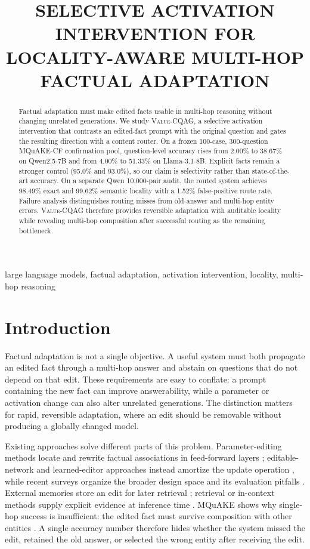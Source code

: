 \documentclass{article}
\title{SELECTIVE ACTIVATION INTERVENTION FOR LOCALITY-AWARE MULTI-HOP FACTUAL ADAPTATION}
\newcommand{\method}{\textsc{Value-CQAG}}
\begin{document}
\ninept
\sloppy
\maketitle

\begin{abstract}
Factual adaptation must make edited facts usable in multi-hop reasoning without changing unrelated generations. We study \method{}, a selective activation intervention that contrasts an edited-fact prompt with the original question and gates the resulting direction with a content router. On a frozen 100-case, 300-question MQuAKE-CF confirmation pool, question-level accuracy rises from 2.00\% to 38.67\% on Qwen2.5-7B and from 4.00\% to 51.33\% on Llama-3.1-8B. Explicit facts remain a stronger control (95.0\% and 93.0\%), so our claim is selectivity rather than state-of-the-art accuracy. On a separate Qwen 10,000-pair audit, the routed system achieves 98.49\% exact and 99.62\% semantic locality with a 1.52\% false-positive route rate. Failure analysis distinguishes routing misses from old-answer and multi-hop entity errors. \method{} therefore provides reversible adaptation with auditable locality while revealing multi-hop composition after successful routing as the remaining bottleneck.
\end{abstract}

\begin{keywords}
large language models, factual adaptation, activation intervention, locality, multi-hop reasoning
\end{keywords}

\section{Introduction}
Factual adaptation is not a single objective. A useful system must both propagate an edited fact through a multi-hop answer and abstain on questions that do not depend on that edit. These requirements are easy to conflate: a prompt containing the new fact can improve answerability, while a parameter or activation change can also alter unrelated generations. The distinction matters for rapid, reversible adaptation, where an edit should be removable without producing a globally changed model.

Existing approaches solve different parts of this problem. Parameter-editing methods locate and rewrite factual associations in feed-forward layers \cite{geva2021transformer,meng2022rome,meng2023memit,dai2022knowledge}; editable-network and learned-editor approaches instead amortize the update operation \cite{sinitsin2020editable,decao2021knowledgeeditor,mitchell2022mend}, while recent surveys organize the broader design space and its evaluation pitfalls \cite{yao2023editing}. External memories store an edit for later retrieval \cite{mitchell2022serac}; retrieval or in-context methods supply explicit evidence at inference time \cite{lewis2020rag,zheng2023ike}. MQuAKE shows why single-hop success is insufficient: the edited fact must survive composition with other entities \cite{zhong2023mquake}. A single accuracy number therefore hides whether the system missed the edit, retained the old answer, or selected the wrong entity after receiving the edit.
\end{document}
